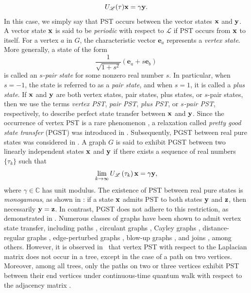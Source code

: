 \documentclass[12pt,a4paper]{article}
\def \e {{\mathbf e}}
\def \x {{\bf x}}
\def \y {{\bf y}}
\def \z {{\bf z}}
\newcommand{\ob}[1]{\left(#1\right)}
\begin{document}
\[U_\mathscr{L}(\tau) \x = \gamma \y.
\]
In this case, we simply say that PST occurs between the vector states $\x$ and $\y$. A vector state $\x$ is said to be \emph{periodic} with respect to $\mathscr{L}$ if PST occurs from $\x$ to itself. For a vertex $a$ in $G$, the characteristic vector $\e_a$ represents a \emph{vertex state}. More generally, a state of the form
\[
\frac{1}{\sqrt{1 + s^2}} \left( \e_a + s \e_b \right)
\]
is called an \emph{$s$-pair state} for some nonzero real number $s$. In particular, when $s = -1$, the state is referred to as a \emph{pair state}, and when $s = 1$, it is called a \emph{plus state}. If $\x$ and $\y$ are both vertex states, pair states, plus states, or $s$-pair states, then we use the terms \emph{vertex PST}, \emph{pair PST}, \emph{plus PST}, or \emph{$s$-pair PST}, respectively, to describe perfect state transfer between $\x$ and $\y$. Since the occurrence of vertex PST is a rare phenomenon \cite{god2}, a relaxation called \emph{pretty good state transfer} (PGST) was introduced in \cite{god1, vin}. Subsequently, PGST between real pure states was considered in \cite{pal9}. A graph $G$ is said to exhibit PGST between two linearly independent states $\x$ and $\y$ if there exists a sequence of real numbers $\{\tau_k\}$ such that
\[
\lim_{k \to \infty} U_\mathscr{L}\ob{\tau_k} \x = \gamma \y,
\]
where $\gamma \in \mathbb{C}$ has unit modulus. The existence of PST between real pure states is \emph{monogamous}, as shown in \cite[Lemma 5.1(3)]{god25}: if a state $\x$ admits PST to both states $\y$ and $\z$, then necessarily $\y = \z$. In contrast, PGST does not adhere to this restriction, as demonstrated in \cite[Example 4.1]{pal5}. Numerous classes of graphs have been shown to admit vertex state transfer, including paths \cite{banchi,kay2,kirk2}, circulant graphs \cite{ang, bavsic, pal6, pal61, pal3}, Cayley graphs \cite{ber, che, pal2}, distance-regular graphs \cite{cou3}, edge-perturbed graphs \cite{bose1, god4, pal8}, blow-up graphs \cite{mon2}, and joins \cite{alvir, ang, kirk1}, among others. However, it is observed in~\cite{cou0} that vertex PST with respect to the Laplacian matrix does not occur in a tree, except in the case of a path on two vertices. Moreover, among all trees, only the paths on two or three vertices exhibit PST between their end vertices under continuous-time quantum walk with respect to the adjacency matrix \cite{cou2024}.
\end{document}
